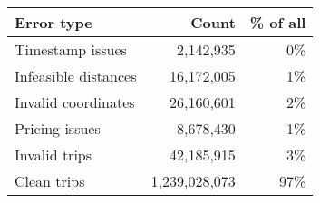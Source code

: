 \begin{tabular}{lrr}
\toprule
Error type & Count & \% of all \\
\midrule
Timestamp issues & 2,142,935 & 0\% \\
Infeasible distances & 16,172,005 & 1\% \\
Invalid coordinates & 26,160,601 & 2\% \\
Pricing issues & 8,678,430 & 1\% \\
\midrule
Invalid trips & 42,185,915 & 3\% \\
Clean trips & 1,239,028,073 & 97\% \\
\bottomrule
\end{tabular}